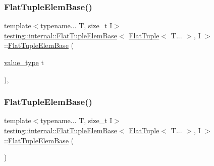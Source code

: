 \subsubsection{\texorpdfstring{FlatTupleElemBase()}{FlatTupleElemBase()}\hspace{0.1cm}{\footnotesize\ttfamily [2/4]}}
{\footnotesize\ttfamily template$<$typename... T, size\+\_\+t I$>$ \\
\mbox{\hyperlink{structtesting_1_1internal_1_1_flat_tuple_elem_base}{testing\+::internal\+::\+Flat\+Tuple\+Elem\+Base}}$<$ \mbox{\hyperlink{classtesting_1_1internal_1_1_flat_tuple}{Flat\+Tuple}}$<$ T... $>$, I $>$\+::\mbox{\hyperlink{structtesting_1_1internal_1_1_flat_tuple_elem_base}{Flat\+Tuple\+Elem\+Base}} (\begin{DoxyParamCaption}\item[{\mbox{\hyperlink{structtesting_1_1internal_1_1_flat_tuple_elem_base_3_01_flat_tuple_3_01_t_8_8_8_01_4_00_01_i_01_4_a6b87a445f87724f9363b348e6c697766}{value\+\_\+type}}}]{t }\end{DoxyParamCaption})\hspace{0.3cm}{\ttfamily [inline]}, {\ttfamily [explicit]}}

\mbox{\label{structtesting_1_1internal_1_1_flat_tuple_elem_base_3_01_flat_tuple_3_01_t_8_8_8_01_4_00_01_i_01_4_a7b460283c4ba5ad116a4305d05155546}} 
\subsubsection{\texorpdfstring{FlatTupleElemBase()}{FlatTupleElemBase()}\hspace{0.1cm}{\footnotesize\ttfamily [3/4]}}
{\footnotesize\ttfamily template$<$typename... T, size\+\_\+t I$>$ \\
\mbox{\hyperlink{structtesting_1_1internal_1_1_flat_tuple_elem_base}{testing\+::internal\+::\+Flat\+Tuple\+Elem\+Base}}$<$ \mbox{\hyperlink{classtesting_1_1internal_1_1_flat_tuple}{Flat\+Tuple}}$<$ T... $>$, I $>$\+::\mbox{\hyperlink{structtesting_1_1internal_1_1_flat_tuple_elem_base}{Flat\+Tuple\+Elem\+Base}} (\begin{DoxyParamCaption}{ }\end{DoxyParamCaption})\hspace{0.3cm}{\ttfamily [default]}}

